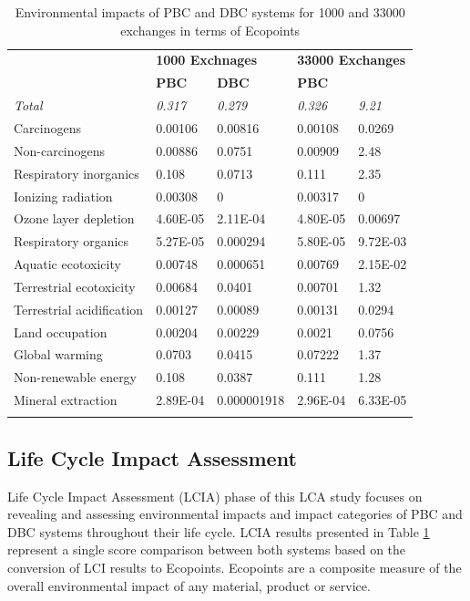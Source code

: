 \documentclass[3p,times,procedia]{elsarticle}
\begin{document}
\begin{table}[h]
\caption{Environmental impacts of PBC and DBC systems for 1000 and 33000 exchanges in terms of Ecopoints}
\begin{tabular*}{\hsize}{@{\extracolsep{\fill}}llllll@{}}
\toprule
\multicolumn{2}{l}{\multirow{2}{*}{\textbf{}}} & \multicolumn{2}{l}{\textbf{1000 Exchnages}} & \multicolumn{2}{l}{\textbf{33000 Exchanges}} \\ 
\colrule
\multicolumn{2}{l}{} & \textbf{DBC} & \textbf{PBC} & \textbf{DBC} & \textbf{PBC} \\
\multicolumn{2}{l}{\it{Total}} & \it{0.317} & \it{0.279} & \it{0.326} & \it{9.21} \\ 
\multicolumn{2}{l}{Carcinogens} & 0.00106 & 0.00816 & 0.00108 & 0.0269 \\ 
\multicolumn{2}{l}{Non-carcinogens} & 0.00886 & 0.0751 & 0.00909 & 2.48 \\ 
\multicolumn{2}{l}{Respiratory inorganics} & 0.108 & 0.0713 & 0.111 & 2.35 \\
\multicolumn{2}{l}{Ionizing radiation} & 0.00308 & 0 & 0.00317 & 0 \\
\multicolumn{2}{l}{Ozone layer depletion} & 4.60E-05 & 2.11E-04 & 4.80E-05 & 0.00697 \\ 
\multicolumn{2}{l}{Respiratory organics} & 5.27E-05 & 0.000294 & 5.80E-05 & 9.72E-03 \\
\multicolumn{2}{l}{Aquatic ecotoxicity} & 0.00748 & 0.000651 & 0.00769 & 2.15E-02 \\
\multicolumn{2}{l}{Terrestrial ecotoxicity} & 0.00684 & 0.0401 & 0.00701 & 1.32 \\ 
\multicolumn{2}{l}{Terrestrial acidification} & 0.00127 & 0.00089 & 0.00131 & 0.0294 \\ 
\multicolumn{2}{l}{Land occupation} & 0.00204 & 0.00229 & 0.0021 & 0.0756 \\ 
\multicolumn{2}{l}{Global warming} & 0.0703 & 0.0415 & 0.07222 & 1.37 \\ 
\multicolumn{2}{l}{Non-renewable energy} & 0.108 & 0.0387 & 0.111 & 1.28 \\ 
\multicolumn{2}{l}{Mineral extraction} & 2.89E-04 & 0.000001918 & 2.96E-04 & 6.33E-05 \\ 

\botrule
\end{tabular*}
\label{PBCandDBCexchanges}
\end{table}
\vspace{-0.5cm}
\subsection{Life Cycle Impact Assessment}
Life Cycle Impact Assessment (LCIA) phase of this LCA study focuses on revealing and assessing environmental impacts and impact categories of PBC and DBC systems throughout their life cycle. LCIA results presented in Table \ref{PBCandDBCexchanges} represent a single score comparison between both systems based on the conversion of LCI results to Ecopoints. Ecopoints are a composite measure of the overall environmental impact of any material, product or service.\\
\end{document}
